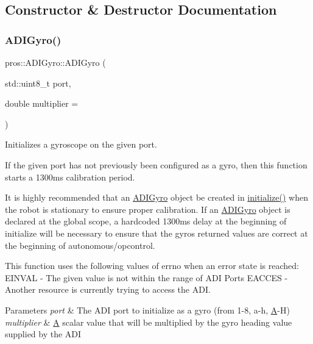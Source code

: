 \subsection{Constructor \& Destructor Documentation}
\mbox{\label{classpros_1_1ADIGyro_adc826b3bcb88213a0df283178279662a}} 
\subsubsection{\texorpdfstring{ADIGyro()}{ADIGyro()}}
{\footnotesize\ttfamily pros\+::\+A\+D\+I\+Gyro\+::\+A\+D\+I\+Gyro (\begin{DoxyParamCaption}\item[{std\+::uint8\+\_\+t}]{port,  }\item[{double}]{multiplier = {} }\end{DoxyParamCaption})}



Initializes a gyroscope on the given port. 

If the given port has not previously been configured as a gyro, then this function starts a 1300ms calibration period.

It is highly recommended that an \mbox{\hyperlink{classpros_1_1ADIGyro}{A\+D\+I\+Gyro}} object be created in \mbox{\hyperlink{initialize_8cpp_a25a40b6614565f755233080a384c35f1}{initialize()}} when the robot is stationary to ensure proper calibration. If an \mbox{\hyperlink{classpros_1_1ADIGyro}{A\+D\+I\+Gyro}} object is declared at the global scope, a hardcoded 1300ms delay at the beginning of initialize will be necessary to ensure that the gyro\textquotesingle{}s returned values are correct at the beginning of autonomous/opcontrol.

This function uses the following values of errno when an error state is reached\+: E\+I\+N\+V\+AL -\/ The given value is not within the range of A\+DI Ports E\+A\+C\+C\+ES -\/ Another resource is currently trying to access the A\+DI.


\begin{DoxyParams}{Parameters}
{\em port} & The A\+DI port to initialize as a gyro (from 1-\/8, \textquotesingle{}a\textquotesingle{}-\/\textquotesingle{}h\textquotesingle{}, \textquotesingle{}\mbox{\hyperlink{structA}{A}}\textquotesingle{}-\/\textquotesingle{}H\textquotesingle{}) \\
\hline
{\em multiplier} & \mbox{\hyperlink{structA}{A}} scalar value that will be multiplied by the gyro heading value supplied by the A\+DI \\
\hline
\end{DoxyParams}
\mbox{\label{classpros_1_1ADIGyro_aa54d1f36850ba9a3ab6c749238950843}} 
